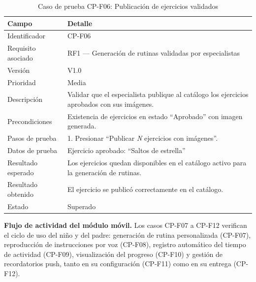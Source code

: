 				\begin{table}[H]
					\centering\small
					\caption{Caso de prueba CP-F06: Publicación de ejercicios validados}
					\label{tab:cpf06}
					\begin{tabular}{p{3cm}p{12.0cm}}
						\hline
						\textbf{Campo} & \textbf{Detalle}\\
						\hline
						Identificador & CP-F06\\
						Requisito asociado & RF1 --- Generación de rutinas validadas por especialistas\\
						Versión & V1.0\\
						Prioridad & Media\\
						Descripción & Validar que el especialista publique al catálogo los ejercicios aprobados con sus imágenes.\\
						Precondiciones & Existencia de ejercicios en estado ``Aprobado'' con imagen generada.\\
						Pasos de prueba & 1. Presionar ``Publicar \textit{N} ejercicios con imágenes''.\\
						Datos de prueba & Ejercicio aprobado: ``Saltos de estrella''\\
						Resultado esperado & Los ejercicios quedan disponibles en el catálogo activo para la generación de rutinas.\\
						Resultado obtenido & El ejercicio se publicó correctamente en el catálogo.\\
						Estado & Superado\\
						\hline
					\end{tabular}
				\end{table}
				\tblnote
				
				\textbf{Flujo de actividad del módulo móvil.} Los casos CP-F07 a CP-F12 verifican el ciclo de uso del niño y del padre: generación de rutina personalizada (CP-F07), reproducción de instrucciones por voz (CP-F08), registro automático del tiempo de actividad (CP-F09), visualización del progreso (CP-F10) y gestión de recordatorios push, tanto en su configuración (CP-F11) como en su entrega (CP-F12).
				
